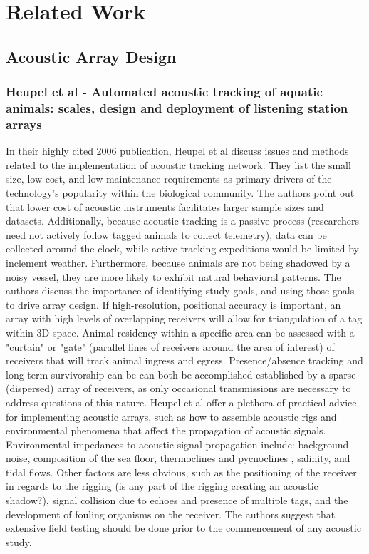 \chapter{Related Work}

\section{Acoustic Array Design}

\subsection{Heupel et al - Automated acoustic tracking of aquatic animals: scales, design and deployment of listening station arrays}
In their highly cited 2006 publication, Heupel et al discuss issues and methods related to the implementation of acoustic tracking network.  They list the small size, low cost, and low maintenance requirements as primary drivers of the technology's popularity within the biological community.  The authors point out that lower cost of acoustic instruments facilitates larger sample sizes and datasets.  Additionally, because acoustic tracking is a passive process (researchers need not actively follow tagged animals to collect telemetry), data can be collected around the clock, while active tracking expeditions would be limited by inclement weather.  Furthermore, because animals are not being shadowed by a noisy vessel, they are more likely to exhibit natural behavioral patterns.\newline
\newline
The authors discuss the importance of identifying study goals, and using those goals to drive array design.  If high-resolution, positional accuracy is important, an array with high levels of overlapping receivers will allow for triangulation of a tag within 3D space.  Animal residency within a specific area can be assessed with a "curtain" or "gate" (parallel lines of receivers around the area of interest) of receivers that will track animal ingress and egress.  Presence/absence tracking and long-term survivorship can be can both be accomplished established by a sparse (dispersed) array of receivers, as only occasional transmissions are necessary to address questions of this nature.\newline
\newline
Heupel et al offer a plethora of practical advice for implementing acoustic arrays, such as how to assemble acoustic rigs and environmental phenomena that affect the propagation of acoustic signals.  Environmental impedances to acoustic signal propagation include: background noise, composition of the sea floor, thermoclines and pycnoclines , salinity, and tidal flows.  Other factors are less obvious, such as the positioning of the receiver in regards to the rigging (is any part of the rigging creating an acoustic shadow?), signal collision due to echoes and presence of multiple tags, and the development of fouling organisms on the receiver.  The authors suggest that extensive field testing should be done prior to the commencement of any acoustic study.




